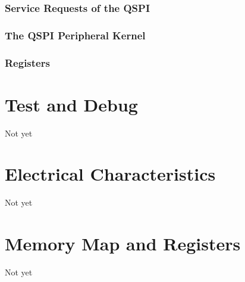\subsection{Service Requests of the QSPI}

\subsection{The QSPI Peripheral Kernel}
\label{subsec:qspifunc02}


\subsection{Registers}




%

\chapter{Test and Debug}
Not yet

\chapter{Electrical Characteristics}
Not yet

\chapter{Memory Map and Registers}
Not yet



